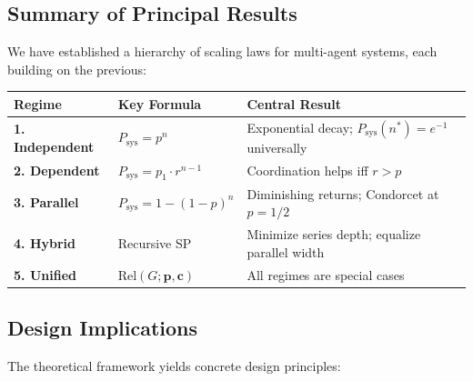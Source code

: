 \documentclass[12pt,a4paper]{article}
\theoremstyle{plain}
\theoremstyle{definition}
\theoremstyle{remark}
\newcommand{\Psys}{P_{\mathrm{sys}}}
\newcommand{\Rel}{\mathrm{Rel}}
\begin{document}
\subsection{Summary of Principal Results}

We have established a hierarchy of scaling laws for multi-agent systems, each
building on the previous:

\begin{center}
\renewcommand{\arraystretch}{1.4}
\begin{tabular}{>{\bfseries}l l l}
\toprule
Regime & Key Formula & Central Result \\
\midrule
1. Independent &
  $\Psys = p^n$ &
  Exponential decay; $\Psys(n^*) = e^{-1}$ universally \\
2. Dependent &
  $\Psys = p_1 \cdot r^{n-1}$ &
  Coordination helps iff $r > p$ \\
3. Parallel &
  $\Psys = 1-(1-p)^n$ &
  Diminishing returns; Condorcet at $p=1/2$ \\
4. Hybrid &
  Recursive SP &
  Minimize series depth; equalize parallel width \\
5. Unified &
  $\Rel(G; \mathbf{p}, \mathbf{c})$ &
  All regimes are special cases \\
\bottomrule
\end{tabular}
\end{center}

\subsection{Design Implications}

The theoretical framework yields concrete design principles:
\end{document}
